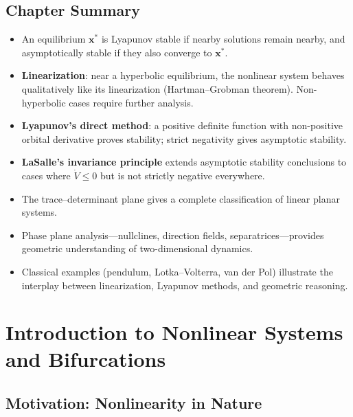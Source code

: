 \documentclass[12pt,a4paper,openany]{book}
\theoremstyle{definition}
\theoremstyle{plain}
\theoremstyle{remark}
\begin{document}
\section{Chapter Summary}
\label{sec:stability-chapter-summary}

\begin{itemize}
  \item An equilibrium \(\mathbf{x}^*\) is Lyapunov stable if nearby solutions
    remain nearby, and asymptotically stable if they also converge to
    \(\mathbf{x}^*\).
  \item \textbf{Linearization}: near a hyperbolic equilibrium, the nonlinear
    system behaves qualitatively like its linearization (Hartman--Grobman
    theorem). Non-hyperbolic cases require further analysis.
  \item \textbf{Lyapunov's direct method}: a positive definite function with
    non-positive orbital derivative proves stability; strict negativity gives
    asymptotic stability.
  \item \textbf{LaSalle's invariance principle} extends asymptotic stability
    conclusions to cases where \(\dot{V}\le 0\) but is not strictly negative
    everywhere.
  \item The trace--determinant plane gives a complete classification of linear
    planar systems.
  \item Phase plane analysis---nullclines, direction fields, separatrices---provides
    geometric understanding of two-dimensional dynamics.
  \item Classical examples (pendulum, Lotka--Volterra, van der Pol) illustrate
    the interplay between linearization, Lyapunov methods, and geometric
    reasoning.
\end{itemize}



\chapter{Introduction to Nonlinear Systems and Bifurcations}
\label{ch:nonlinear-bifurcations}

\section{Motivation: Nonlinearity in Nature}
\label{sec:nonlinear-motivation}
\end{document}
